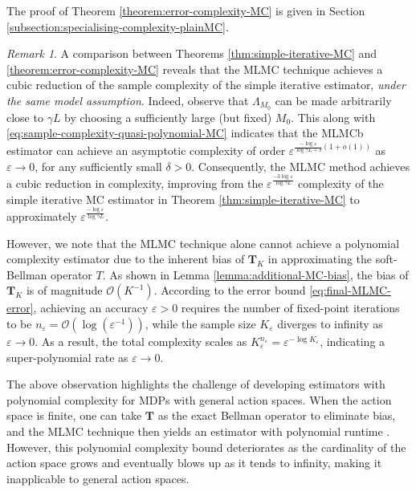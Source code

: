 \documentclass[11pt]{article}
\numberwithin{equation}{section}
\theoremstyle{definition}
\theoremstyle{remark}
\newtheorem{remark}{Remark}[section]
\newcommand{\citep}{\cite}
\begin{document}
The proof of Theorem \ref{theorem:error-complexity-MC} is given in Section \ref{subsection:specialising-complexity-plainMC}.

 

\begin{remark}
\label{rmk:quasi-polynomial_MLMC}    
A comparison between   
Theorems \ref{thm:simple-iterative-MC} and 
 \ref{theorem:error-complexity-MC}
reveals  that the MLMC technique achieves a cubic reduction of  the sample complexity
of the simple iterative  estimator, 
\emph{under the same model assumption}.   
Indeed, observe that  $\Lambda_{M_0}$ can be made arbitrarily close to $\gamma L$ by choosing a sufficiently large (but fixed) $M_0$. 
This along with \eqref{eq:sample-complexity-quasi-polynomial-MC} 
indicates that the MLMCb estimator can achieve an asymptotic complexity of order  $\varepsilon^{\frac{- \log \varepsilon}{\log \gamma L + \delta}(1 + o(1))}$ as $\varepsilon\to 0$, for any sufficiently small $\delta>0$.
Consequently,
the MLMC method achieves a cubic reduction in complexity, improving from the 
$\varepsilon^{\frac{-3 \log \varepsilon}{\log \gamma L }}$ complexity of the simple iterative MC estimator in Theorem \ref{thm:simple-iterative-MC}
to approximately 
$\varepsilon^{\frac{- \log \varepsilon}{\log \gamma L }}$. 


However,
we note that the MLMC technique alone cannot achieve a polynomial complexity estimator due to the inherent bias of 
$ \mathbf{T}_K$    in approximating the soft-Bellman operator $T$.
As shown in Lemma \ref{lemma:additional-MC-bias}, 
the bias of 
$\mathbf{T}_K$ is of magnitude $\mathcal{O}(K^{-1})$.   
According to  the error bound \eqref{eq:final-MLMC-error},  
 achieving an accuracy $\varepsilon > 0$
 requires 
the number    of fixed-point iterations to   be   $n_\varepsilon = \mathcal{O}(\log (\varepsilon^{-1}))$, while  the sample size $K_\varepsilon$    diverges to infinity as $\varepsilon \to 0$.  
As a result, the total complexity scales as $K_\varepsilon^{n_\varepsilon} = \varepsilon^{-\log K_\varepsilon}$, indicating  a super-polynomial rate as $\varepsilon\to 0$.


 
 The above observation highlights the challenge of developing estimators with polynomial complexity for MDPs with general action spaces.  
When the action space is finite, one can take \(\mathbf{T}\) as the exact Bellman operator to  eliminate bias, and the MLMC technique then yields an estimator with polynomial runtime \citep{beck2023nonlinearmontecarlomethods}.  
However, this polynomial complexity bound deteriorates as the cardinality of the action space grows and eventually blows up as it tends to infinity, making it inapplicable to general action spaces.

 \end{remark}
\end{document}
